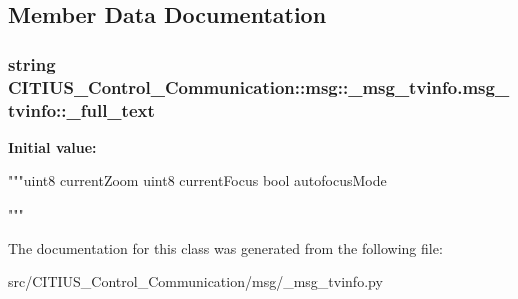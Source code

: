 \subsection{\-Member \-Data \-Documentation}
\hypertarget{class_c_i_t_i_u_s___control___communication_1_1msg_1_1__msg__tvinfo_1_1msg__tvinfo_af6380ddb9cb4e8dd3b2e6709d0b9161b}{
\subsubsection[{\-\_\-full\-\_\-text}]{\setlength{\rightskip}{0pt plus 5cm}string \-C\-I\-T\-I\-U\-S\-\_\-\-Control\-\_\-\-Communication\-::msg\-::\-\_\-msg\-\_\-tvinfo.\-msg\-\_\-tvinfo\-::\-\_\-full\-\_\-text}}\label{class_c_i_t_i_u_s___control___communication_1_1msg_1_1__msg__tvinfo_1_1msg__tvinfo_af6380ddb9cb4e8dd3b2e6709d0b9161b}
{\bfseries \-Initial value\-:}
\begin{DoxyCode}
"""uint8 currentZoom
uint8 currentFocus
bool autofocusMode

"""
\end{DoxyCode}


\-The documentation for this class was generated from the following file\-:\begin{DoxyCompactItemize}
\item 
src/\-C\-I\-T\-I\-U\-S\-\_\-\-Control\-\_\-\-Communication/msg/\-\_\-msg\-\_\-tvinfo.\-py\end{DoxyCompactItemize}
